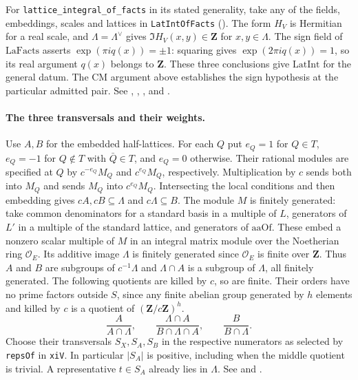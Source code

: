 For \nolinkurl{lattice_integral_of_facts} in its stated generality,
take any of the fields, embeddings, scales and lattices in
\nolinkurl{LatIntOfFacts} ().
The form $H_V$ is Hermitian for a real scale, and $\Lambda=\Lambda^\vee$
gives $\Im H_V(x,y)\in\mathbf Z$ for $x,y\in\Lambda$.
The sign field of $\mathrm{LaFacts}$ asserts $\exp(\pi i q(x))=\pm1$:
squaring gives $\exp(2\pi i q(x))=1$, so its real argument $q(x)$
belongs to $\mathbf Z$. These three conclusions give $\mathrm{LatInt}$
for the general datum. The CM argument above establishes the sign
hypothesis at the particular admitted pair.
See ,
,
,
 and
.

\paragraph{The three transversals and their weights.}\label{r14:kernel-finite}
Use $A,B$ for the embedded half-lattices. For each $Q$ put
$e_Q=1$ for $Q\in T$, $e_Q=-1$ for $Q\notin T$ with $\bar Q\in T$,
and $e_Q=0$ otherwise. Their rational modules are specified at $Q$
by $c^{-e_Q}M_Q$ and $c^{e_Q}M_Q$, respectively. Multiplication by
$c$ sends both into $M_Q$ and sends $M_Q$ into $c^{e_Q}M_Q$.
Intersecting the local conditions and then embedding gives
$cA,cB\subseteq\Lambda$ and $c\Lambda\subseteq B$.
The module $M$ is finitely generated: take common denominators for
a standard basis in a multiple of $L$, generators of $L'$ in a
multiple of the standard lattice, and generators of $\mathrm{aaOf}$.
These embed a nonzero scalar multiple of $M$ in an integral matrix
module over the Noetherian ring $\mathcal O_E$. Its additive image
$\Lambda$ is finitely generated since $\mathcal O_E$ is finite over
$\mathbf Z$. Thus $A$ and $B$ are subgroups of $c^{-1}\Lambda$ and
$\Lambda\cap A$ is a subgroup of $\Lambda$, all finitely generated.
The following quotients are killed by $c$, so are finite. Their orders
have no prime factors outside $S$, since any finite abelian group
generated by $h$ elements and killed by $c$ is a quotient of
$(\mathbf Z/c\mathbf Z)^h$.
\[
  \frac{A}{A\cap\Lambda},\qquad
  \frac{\Lambda\cap A}{B\cap\Lambda\cap A},\qquad
  \frac{B}{B\cap\Lambda}.
\]
Choose their transversals $S_X,S_A,S_B$ in the respective numerators
as selected by \nolinkurl{repsOf} in \nolinkurl{xiV}.
In particular $|S_A|$ is positive, including when the middle quotient
is trivial. A representative $t\in S_A$ already lies in $\Lambda$.
See  and
.

